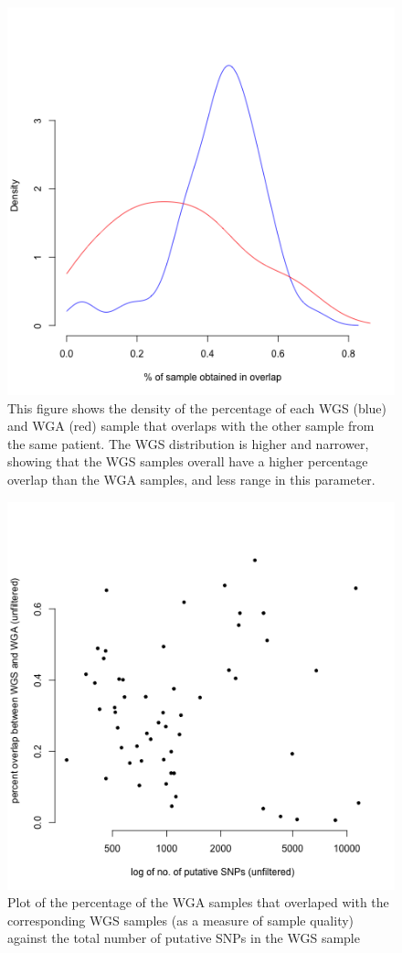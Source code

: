 \documentclass[11pt]{article} %
\begin{document}
\begin{figure}
\includegraphics[scale=1.0]{unfiltered_overlap_WGS_WGA_together_densities.png}
\caption{This figure shows the density of the percentage of each WGS (blue) and WGA (red) sample that overlaps with the other sample from the same patient. The WGS distribution is higher and narrower, showing that the WGS samples overall have a higher percentage overlap than the WGA samples, and less range in this parameter. }
\end{figure}

\begin{figure}
\includegraphics[scale=1.0]{unfiltered_total_muts_v_percent_overlap.png}
\caption{Plot of the percentage of the WGA samples that overlaped with the corresponding WGS samples (as a measure of sample quality) against the total number of putative SNPs in the WGS sample}
\end{figure}
\end{document}
